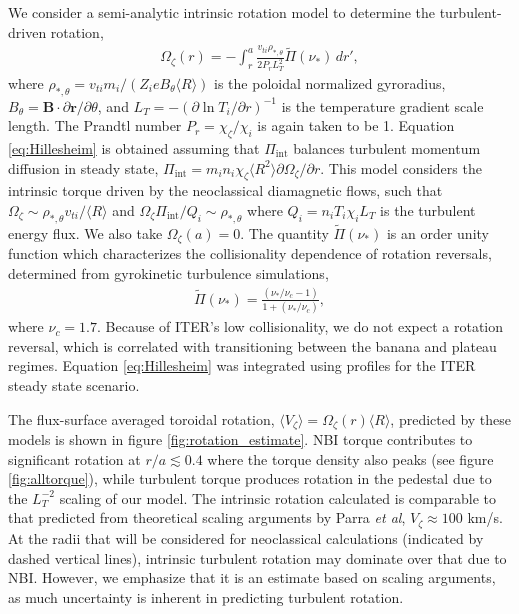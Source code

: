 \documentclass[aip, pop, preprint]{revtex4-1}
\numberwithin{figure}{section}
\numberwithin{equation}{section}
\begin{document}
We consider a semi-analytic intrinsic rotation model to determine the turbulent-driven rotation,\cite{Hillesheim2015}
\begin{gather}
\Omega_{\zeta}(r) = - \int_{r}^a \frac{v_{ti} \rho_{*,\theta}} {2 P_r L_T^2} \widetilde{\Pi} (\nu_*) \, d r',
\label{eq:Hillesheim}
\end{gather} 
where $\rho_{*,\theta} = v_{ti} m_i/(Z_i e B_{\theta} \langle R \rangle)$ is the poloidal normalized gyroradius, $B_{\theta} = \bm{B} \cdot \partial \bm{r}/\partial \theta$, and $L_T = - \left( \partial \ln T_i/ \partial r \right)^{-1}$ is the temperature gradient scale length. The Prandtl number $P_r = \chi_{\zeta}/\chi_i$ is again taken to be 1. Equation \ref{eq:Hillesheim} is obtained assuming that $\Pi_{\text{int}}$ balances turbulent momentum diffusion in steady state, $\Pi_{\text{int}} = m_i n_i \chi_{\zeta} \langle R^2 \rangle \partial \Omega_{\zeta}/\partial r$. This model considers the intrinsic torque driven by the neoclassical diamagnetic flows, such that $\Omega_{\zeta} \sim \rho_{*,\theta} v_{ti}/\langle R \rangle$ and $\Omega_{\zeta} \Pi_{\text{int}}/Q_i \sim \rho_{*, \theta}$ where $Q_i = n_i T_i \chi_i L_T$ is the turbulent energy flux. We also take $\Omega_{\zeta}(a) = 0$. The quantity $\widetilde{\Pi} (\nu_*)$ is an order unity function which characterizes the collisionality dependence of rotation reversals, determined from gyrokinetic turbulence simulations,\cite{Barnes2013}
\begin{gather}
\widetilde{\Pi} (\nu_*) = \frac{(\nu_*/\nu_c -1)}{1 + (\nu_*/\nu_c)},
\end{gather}
where $\nu_c = 1.7$. Because of ITER's low collisionality, we do not expect a rotation reversal, which is correlated with transitioning between the banana and plateau regimes. Equation \ref{eq:Hillesheim} was integrated using profiles for the ITER steady state scenario. 

The flux-surface averaged toroidal rotation, $\langle V_{\zeta} \rangle = \Omega_{\zeta}(r) \langle R \rangle$, predicted by these models is shown in figure \ref{fig:rotation_estimate}. NBI torque contributes to significant rotation at $r/a \lesssim 0.4$ where the torque density also peaks (see figure \ref{fig:alltorque}), while turbulent torque produces rotation in the pedestal due to the $L_T^{-2}$ scaling of our model.  The intrinsic rotation calculated is comparable to that predicted from theoretical scaling arguments by Parra \textit{et al},\cite{Parra2012} $V_{\zeta} \approx 100$ km/s. At the radii that will be considered for neoclassical calculations (indicated by dashed vertical lines), intrinsic turbulent rotation may dominate over that due to NBI. However, we emphasize that it is an estimate based on scaling arguments, as much uncertainty is inherent in predicting turbulent rotation. 
\end{document}
